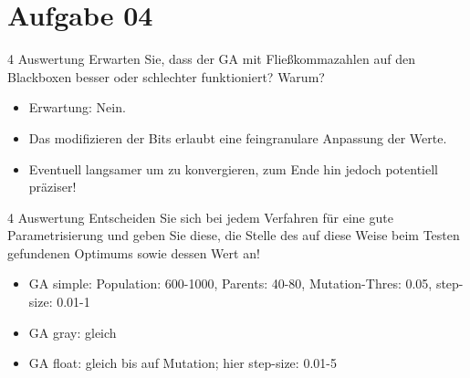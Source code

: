 \documentclass{ocbeameruni}
\begin{document}
\section{Aufgabe 04}

\begin{frame}{4 Auswertung}
Erwarten Sie, dass der GA mit Fließkommazahlen auf den Blackboxen besser oder schlechter
funktioniert? Warum?
    \begin{itemize}
    \item Erwartung: Nein.
    \item Das modifizieren der Bits erlaubt eine feingranulare Anpassung der Werte.
    \item Eventuell langsamer um zu konvergieren, zum Ende hin jedoch potentiell präziser!
    \end{itemize}
\end{frame}

\begin{frame}{4 Auswertung}
Entscheiden Sie sich bei jedem Verfahren für eine gute Parametrisierung und geben Sie diese,
die Stelle des auf diese Weise beim Testen gefundenen Optimums sowie dessen Wert an!
    \begin{itemize}
    \item GA simple: Population: 600-1000, Parents: 40-80, Mutation-Thres: 0.05, step-size: 0.01-1
    \item GA gray: gleich
    \item GA float: gleich bis auf Mutation; hier step-size: 0.01-5
    \end{itemize}
\end{frame}
\end{document}
